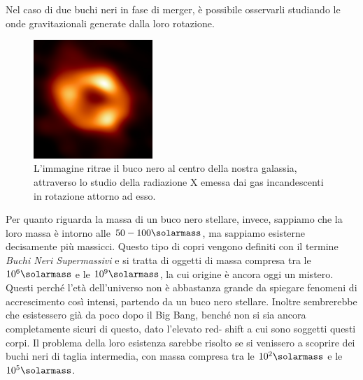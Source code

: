 Nel caso di due buchi neri in fase di merger, è possibile osservarli studiando le onde gravitazionali generate dalla loro rotazione.
\begin{figure}
    \centering
    \includegraphics[width=0.4\textwidth]{immagini/blackhole.png}
    \caption{L'immagine ritrae il buco nero al centro della nostra galassia, attraverso lo studio della radiazione X emessa dai gas incandescenti in rotazione attorno ad esso.}\label{fig:buco-nero}
\end{figure}

Per quanto riguarda la massa di un buco nero stellare, invece, sappiamo che la loro massa è intorno alle $50 - 100\si{\solarmass}$, ma sappiamo esisterne decisamente più massicci. Questo tipo di copri vengono definiti con il termine \textit{Buchi Neri Supermassivi} e si tratta di oggetti di massa compresa tra le $10^6 \si{\solarmass}$ e le $10^9 \si{\solarmass}$, la cui origine è ancora oggi un mistero. Questi perché l'età dell'universo non è abbastanza grande da spiegare fenomeni di accrescimento così intensi, partendo da un buco nero stellare. Inoltre sembrerebbe che esistessero già da poco dopo il Big Bang, benché non si sia ancora completamente sicuri di questo, dato l'elevato red- shift a cui sono soggetti questi corpi. Il problema della loro esistenza sarebbe risolto se si venissero a scoprire dei buchi neri di taglia intermedia, con massa compresa tra le $10^2 \si{\solarmass}$ e le $10^5 \si{\solarmass}$.